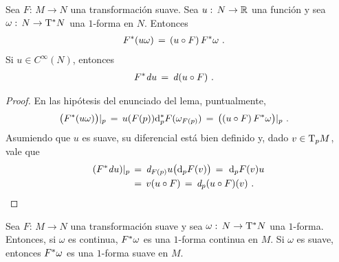 \begin{lemaElPullbackEnUnoFormas}\label{thm:elpullbackenunoformas}
	Sea $F:\,M\rightarrow N$ una transformaci\'{o}n suave.
	Sea $u:\,N\rightarrow\mathbb{R}$ una funci\'{o}n y sea
	$\omega:\,N\rightarrow\tangente*{N}$ una $1$-forma en $N$.
	Entonces
	\begin{align*}
		{F}^{*}(u\omega) & \,=\,(u\circ F)\,{F}^{*}\omega
		\text{ .}
	\end{align*}
	Si $u\in C^{\infty}(N)$, entonces
	\begin{align*}
		{F}^{*}\mathit{d}_{}{u} & \,=\,\mathit{d}_{}{(u\circ F)}
		\text{ .}
	\end{align*}
\end{lemaElPullbackEnUnoFormas}

\begin{proof}
	En las hip\'{o}tesis del enunciado del lema, puntualmente,
	\begin{align*}
		\big(\pull{F}(u\omega)\big)|_{p} & \,=\,
			u(F(p))\diferencial*[p]{F}(\omega_{F(p)}) \,=\,
			\big((u\circ F)\,\pull{F}\omega\big)|_{p}
		\text{ .}
	\end{align*}
	Asumiendo que $u$ es suave, su diferencial est\'{a} bien definido y,
	dado $v\in\tangente[p]{M}$, vale que
	\begin{align*}
		(\pull{F}\derext{u})|_{p} & \,=\,
			\derext[F(p)]{u}\big(\diferencial[p]{F}(v)\big) \,=\
			\diferencial[p]{F}(v)u \\
		& \,=\,v(u\circ F) \,=\,\derext[p]{(u\circ F)}(v)
		\text{ .}
	\end{align*}
\end{proof}

\begin{propoElPullbackDeUnaSuave}\label{thm:elpullbackdeunasuave}
	Sea $F:\,M\rightarrow N$ una transformaci\'{o}n suave y
	sea $\omega:\,N\rightarrow\tangente*{N}$ una $1$-forma.
	Entonces, si $\omega$ es continua, ${F}^{*}\omega$ es una
	$1$-forma continua en $M$. Si $\omega$ es suave, entonces
	${F}^{*}\omega$ es una $1$-forma suave en $M$.
\end{propoElPullbackDeUnaSuave}

